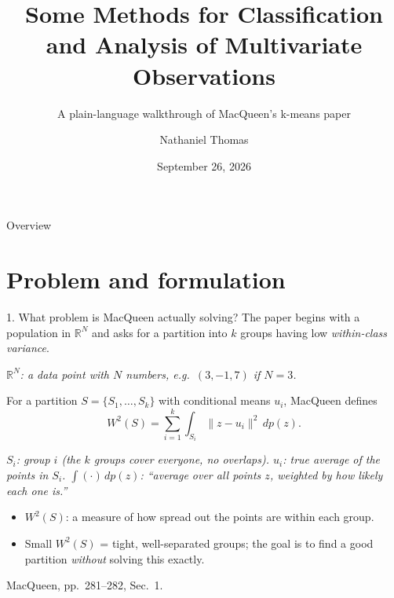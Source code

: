 \documentclass[10pt,compress]{beamer}
\title[k-means: MacQueen (1967)]{Some Methods for Classification and Analysis of Multivariate Observations}
\subtitle{A plain-language walkthrough of MacQueen's k-means paper}
\author[Thomas]{Nathaniel Thomas}
\date[September 26, 2026]{September 26, 2026}
\institute[Texas A\&M University]{Texas A\&M University}
\newcommand{\R}{\mathbb{R}}
\newcommand{\norm}[1]{\lVert #1\rVert}
\newcommand{\defline}[1]{{\footnotesize\textcolor{aggiemaroon}{\textit{#1}}\par}}
\begin{document}
\begin{frame}
  \titlepage
\end{frame}

\begin{frame}{Overview}
\tableofcontents
\end{frame}

\section[Problem]{Problem and formulation}

\begin{frame}{1. What problem is MacQueen actually solving?}
The paper begins with a population in $\R^N$ and asks for a partition into $k$ groups having low \emph{within-class variance}.
\defline{$\R^N$: a data point with $N$ numbers, e.g.\ $(3,-1,7)$ if $N=3$.}

For a partition $S=\{S_1,\ldots,S_k\}$ with conditional means $u_i$, MacQueen defines
\[
W^2(S)=\sum_{i=1}^k \int_{S_i}\norm{z-u_i}^2\,dp(z).
\]
\defline{$S_i$: group $i$ (the $k$ groups cover everyone, no overlaps). $u_i$: true average of the points in $S_i$. $\int(\cdot)\,dp(z)$: ``average over all points $z$, weighted by how likely each one is.''}
\begin{itemize}\small
\item $W^2(S)$: a measure of how spread out the points are within each group.
\item Small $W^2(S)$ = tight, well-separated groups; the goal is to find a good partition \emph{without} solving this exactly.
\end{itemize}
\vfill
{\scriptsize MacQueen, pp.~281--282, Sec.~1.}
\end{frame}
\end{document}
